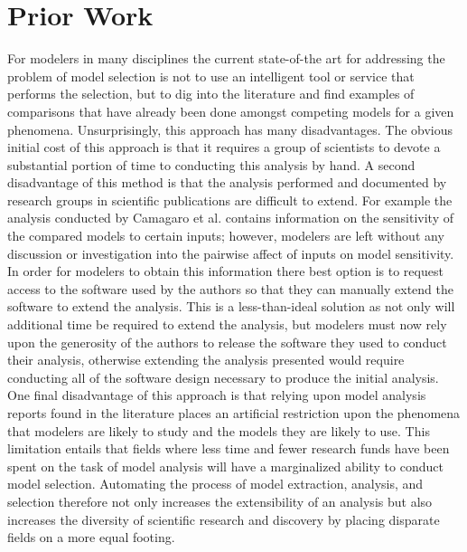 \section{Prior Work\label{sec:prior_work}}
For modelers in many disciplines the current state-of-the art for addressing the problem of model selection is not to use an intelligent tool or service that performs the selection, but to dig into the literature and find examples of comparisons that have already been done amongst competing models for a given phenomena. Unsurprisingly, this approach has many disadvantages. The obvious initial cost of this approach is that it requires a group of scientists to devote a substantial portion of time to conducting this analysis by hand. A second disadvantage of this method is that the analysis performed and documented by research groups in scientific publications are difficult to extend. For example the analysis conducted by Camagaro et al. contains information on the sensitivity of the compared models to certain inputs; however, modelers are left without any discussion or investigation into the pairwise affect of inputs on model sensitivity. In order for modelers to obtain this information there best option is to request access to the software used by the authors so that they can manually extend the software to extend the analysis. This is a less-than-ideal solution as not only will additional time be required to extend the analysis, but modelers must now rely upon the generosity of the authors to release the software they used to conduct their analysis, otherwise extending the analysis presented would require conducting all of the software design necessary to produce the initial analysis. One final disadvantage of this approach is that relying upon model analysis reports found in the literature places an artificial restriction upon the phenomena that modelers are likely to study and the models they are likely to use. This limitation entails that fields where less time and fewer research funds have been spent on the task of model analysis will have a marginalized ability to conduct model selection. Automating the process of model extraction, analysis, and selection therefore not only increases the extensibility of an analysis but also increases the diversity of scientific research and discovery by placing disparate fields on a more equal footing.

